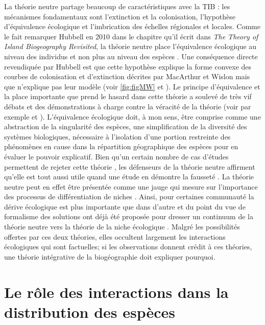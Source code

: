 La théorie neutre partage beaucoup de caractéristiques avec la TIB : les
mécanismes fondamentaux sont l'extinction et la colonisation,
l'hypothèse d'équivalence écologique et l'imbrication des échelles
régionales et locales. Comme le fait remarquer Hubbell en 2010 dans le
chapitre qu'il écrit dans \emph{The Theory of Island Biogeography
Revisited}, la théorie neutre place l'équivalence écologique au niveau
des individus et non plus au niveau des espèces \citep{Hubbell2010}. Une
conséquence directe revendiquée par Hubbell est que cette hypothèse
explique la forme convexe des courbes de colonisation et d'extinction
décrites par MacArthur et Wislon mais que n'explique pas leur modèle
(voir \ref{fig:figMW} et \citet{Hubbell2010}). Le principe d'équivalence
et la place importante que prend le hasard dans cette théorie a soulevé
de très vif débats et des démonstrations à charge contre la véracité de
la théorie (voir par exemple \citet{McGill2003} et
\citet{Ricklefs2003}). L'équivalence écologique doit, à mon sens, être
comprise comme une abstraction de la singularité des espèces, une
simplification de la diversité des systèmes biologiques, nécessaire à
l'isolation d'une portion restreinte des phénomènes en cause dans la
répartition géographique des espèces pour en évaluer le pouvoir
explicatif. Bien qu'un certain nombre de cas d'études permettent de
rejeter cette théorie \citep[\citet{John2007}]{McGill2003}, les
défenseurs de la théorie neutre affirment qu'elle est tout aussi utile
quand une étude en démontre la fausseté \citep{Rosindell2012}. La
théorie neutre peut en effet être présentée comme une jauge qui mesure
sur l'importance des processus de différentiation de niches
\citep{Wennekes2012}. Ainsi, pour certaines communauté la dérive
écologique est plus importante que dans d'autre et du point du vue de
formalisme des solutions ont déjà été proposée pour dresser un continuum
de la théorie neutre vers la théorie de la niche écologique
\citep{Gravel2006a}. Malgré les possibilités offertes par ces deux
théories, elles occultent largement les interactions écologiques qui
sont factuelles; si les observations donnent crédit à ces théories, une
théorie intégrative de la biogéographie doit expliquer pourquoi.

\section*{Le rôle des interactions dans la distribution des
espèces}\label{le-ruxf4le-des-interactions-dans-la-distribution-des-espuxe8ces}

